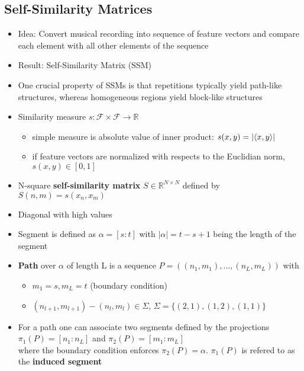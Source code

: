 \documentclass{scrartcl}
\DeclarePairedDelimiter\inner{\langle}{\rangle}%
\begin{document}
\subsection*{Self-Similarity Matrices}
\begin{itemize}
    \item
        Idea: Convert musical recording into sequence of feature vectors and compare each element with all other elements of the sequence
    \item
        Result: Self-Similarity Matrix (SSM)
    \item
        One crucial property of SSMs is that repetitions typically yield path-like structures, whereas homogeneous regions yield block-like structures\\
    \item
        Similarity measure $s:\mathcal{F} \times \mathcal{F} \rightarrow \mathbb{R}$
        \begin{itemize}
            \item
                simple measure is absolute value of inner product: $s(x,y) = |\inner{x,y}|$
            \item
                if feature vectors are normalized with respects to the Euclidian norm, $s(x,y) \in [0,1]$
        \end{itemize}
    \item
        N-square \textbf{self-similarity matrix} $S\in \mathbb{R}^{N\times N}$ defined by $S(n,m) = s(x_n, x_m)$
    \item
        Diagonal with high values
    \item
        Segment is defined as $\alpha = [s:t]$ with $|\alpha| = t-s+1$ being the length of the segment
    \item
        \textbf{Path} over $\alpha$ of length L is a sequence $P=((n_1, m_1), \dots, (n_L, m_L))$ with
        \begin{itemize}
            \item
                $m_1 = s, m_L=t$ (boundary condition)
            \item
                $(n_{l+1}, m_{l+1}) - (n_l, m_l) \in \Sigma$, $\Sigma = \{(2,1), (1,2), (1,1)\}$
        \end{itemize}
    \item
        For a path one can associate two segments defined by the projections\\
        $\pi_1(P) = [n_1 : n_L]$ and $\pi_2(P) = [m_1 : m_L]$\\
        where the boundary condition enforces $\pi_2(P)=\alpha$. $\pi_1(P)$ is refered to as the \textbf{induced segment}

\end{itemize}
\end{document}

